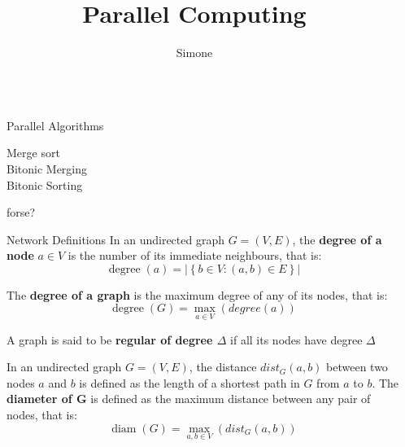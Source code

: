 \documentclass[final]{beamer}
\title{Parallel Computing}
\author{Simone}
\institute[shortinst]{UNIPD}
\newlength{\sepwidth}
\newlength{\colwidth}
\newcommand{\separatorcolumn}{\begin{column}{\sepwidth}\end{column}}
\begin{document}
    \begin{frame}[t]
        \begin{columns}[t]
            \separatorcolumn
            \begin{column}{\colwidth}
                \begin{block}{Parallel Algorithms}
                    \begin{description}
                        \item[Merge sort]  
                        \item[Bitonic Merging]  
                        \item[Bitonic Sorting] 
                    \end{description}

                     forse?

                \end{block}
                \begin{block}{Network Definitions}
                        In an undirected graph \(G = (V, E)\), the \textbf{degree of a node} \(a \in V\) is the number of its immediate neighbours, that is:
                        \begin{equation*}
                            \operatorname{degree}(a) = \left| \left\{ b \in V : (a,b) \in E \right\} \right|
                        \end{equation*}

                        The \textbf{degree of a graph} is the maximum degree of any of its nodes, that is:
                        \begin{equation*}
                            \operatorname{degree}(G) = \max_{a \in V} (degree(a))
                        \end{equation*}

                        A graph is said to be \textbf{regular of degree \(\Delta\) } if all its nodes have degree \(\Delta\)

                    In an undirected graph \(G = (V, E)\), the distance \(dist_G(a, b)\) between two nodes \(a\) and \(b\) is defined as the length of a shortest path in \(G\) from \(a\) to \(b\). The \textbf{diameter of G} is defined as the maximum distance between any pair of nodes, that is:
                    \begin{equation*}
                        \operatorname{diam}(G) = \max_{a,b \in V} (dist_G (a,b))
                    \end{equation*}


\end{block}
\end{column}
\end{columns}
\end{frame}
\end{document}
